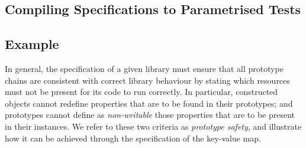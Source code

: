 
\subsection{Compiling Specifications to Parametrised Tests}

\subsection{Example} 

In general, the specification of a given library must ensure that all prototype chains are consistent with correct library behaviour by stating which resources must not be present for its code to run correctly.
In particular, constructed objects cannot redefine properties that are to be found in their prototypes;  and prototypes cannot define as \emph{non-writable} those properties that are to be present in their instances. 
We refer to these two criteria as \emph{prototype safety}, and illustrate how it can be achieved through the specification of the key-value map. 

